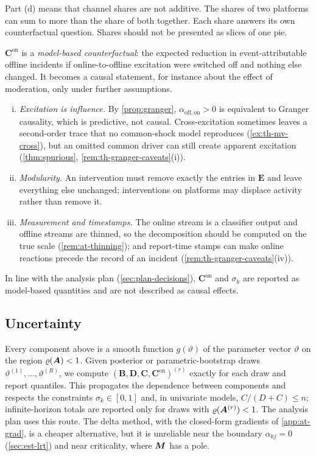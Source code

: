 Part (d) means that channel shares are not additive. The shares of two platforms can sum
to more than the share of both together. Each share answers its own counterfactual
question. Shares should not be presented as slices of one pie.

\begin{remark}\label{rem:at-causal}
$\bm C^{\mathrm{on}}$ is a \emph{model-based counterfactual}: the expected reduction in
event-attributable offline incidents if online-to-offline excitation were switched off and
nothing else changed. It becomes a causal statement, for instance about the effect of
moderation, only under further assumptions.
\begin{enumerate}[(i)]
  \item \emph{Excitation is influence.} By \cref{prop:granger},
  $\alpha_{\mathrm{off},\mathrm{on}}>0$ is equivalent to Granger causality, which is
  predictive, not causal. Cross-excitation sometimes leaves a second-order trace that no
  common-shock model reproduces (\cref{ex:th-mv-cross}), but an omitted common driver can
  still create apparent excitation (\cref{thm:spurious}, \cref{rem:th-granger-caveats}(i)).
  \item \emph{Modularity.} An intervention must remove exactly the entries in $\bm E$ and
  leave everything else unchanged; interventions on platforms may displace activity rather
  than remove it.
  \item \emph{Measurement and timestamps.} The online stream is a classifier output and
  offline streams are thinned, so the decomposition should be computed on the true scale
  (\cref{rem:at-thinning}); and report-time stamps can make online reactions precede the
  record of an incident (\cref{rem:th-granger-caveats}(iv)).
\end{enumerate}
In line with the analysis plan (\cref{sec:plan-decisions}), $\bm C^{\mathrm{on}}$ and $\sigma_k$
are reported as model-based quantities and are not described as causal effects.
\end{remark}

\subsection{Uncertainty}\label{sec:at-uncertainty}

Every component above is a smooth function $g(\vartheta)$ of the parameter vector
$\vartheta$ on the region $\varrho(\bm{A})<1$. Given posterior or parametric-bootstrap draws
$\vartheta^{(1)},\dots,\vartheta^{(R)}$, we compute $(\bm B,\bm D,\bm C,\bm C^{\mathrm{on}})^{(r)}$
exactly for each draw and report quantiles. This propagates the dependence between
components and respects the constraints $\sigma_k\in[0,1]$ and, in univariate models,
$C/(D+C)\le n$; infinite-horizon totals are reported only for draws with
$\varrho(\bm{A}^{(r)})<1$. The analysis plan uses this route. The delta method, with the
closed-form gradients of \cref{app:at-grad}, is a cheaper alternative, but it is unreliable
near the boundary $\alpha_{kj}=0$ (\cref{sec:est-lrt}) and near criticality, where $\bm{M}$
has a pole.

